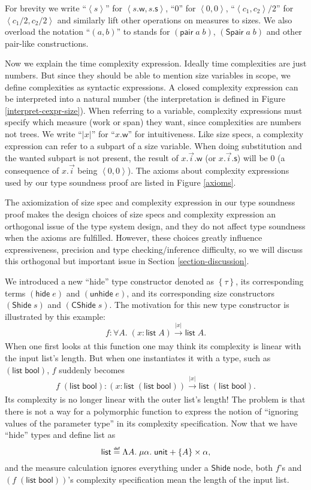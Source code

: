 \documentclass[preprint]{sigplanconf}
\newcommand{\thide}[1]{\left \{ #1 \right \}}
\newcommand{\arrow}[4]{#1\xrightarrow[#3]{#2}#4}
\newcommand{\symhide}{\mathsf{hide}}
\newcommand{\symShide}{\mathsf{Shide}}
\newcommand{\symunhide}{\mathsf{unhide}}
\newcommand{\sympair}{\mathsf{pair}}
\newcommand{\symunit}{\mathsf{unit}}
\newcommand{\symlist}{\mathsf{list}}
\newcommand{\symbool}{\mathsf{bool}}
\newcommand{\symCShide}{\mathsf{CShide}}
\newcommand{\intro}[2]{(#1 : #2)}
\newcommand{\symSpair}{\mathsf{Spair}}
\newcommand{\symwork}{\mathsf{w}}
\newcommand{\symspan}{\mathsf{s}}
\newcommand\defeq{\mathrel{\overset{\makebox[0pt]{\mbox{\normalfont\tiny\sffamily def}}}{=}}}
\newcommand{\Sstats}[1]{\left \langle #1 \right \rangle}
\begin{document}
For brevity we write ``$\Sstats{s}$'' for $\Sstats{s.\symwork,s.\symspan}$, ``0'' for $\Sstats{0,0}$, ``$\Sstats{c_1,c_2}/2$'' for $\Sstats{c_1/2,c_2/2}$ and similarly lift other operations on measures to sizes. We also overload the notation ``$(a,b)$'' to stands for $(\sympair\;a\;b)$, $(\symSpair\;a\;b)$ and other pair-like constructions.

Now we explain the time complexity expression. Ideally time complexities are just numbers. But since they should be able to mention size variables in scope, we define complexities as syntactic expressions. A closed complexity expression can be interpreted into a natural number (the interpretation is defined in Figure \ref{interpret-cexpr-size}). When referring to a variable, complexity expressions must specify which measure (work or span) they want, since complexities are numbers not trees. We write ``$|x|$'' for ``$x.\symwork$'' for intuitiveness. Like size specs, a complexity expression can refer to a subpart of a size variable. When doing substitution and the wanted subpart is not present, the result of $x.\vec{i}.\symwork$ (or $x.\vec{i}.\symspan$) will be 0 (a consequence of $x.\vec{i}$ being $\Sstats{0,0}$). The axioms about complexity expressions used by our type soundness proof are listed in Figure \ref{axioms}.

The axiomization of size spec and complexity expression in our type soundness proof makes the design choices of size specs and complexity expression an orthogonal issue of the type system design, and they do not affect type soundness when the axioms are fulfilled. However, these choices greatly influence expressiveness, precision and type checking/inference difficulty, so we will discuss this orthogonal but important issue in Section \ref{section-discussion}. 

We introduced a new ``hide'' type constructor denoted as $\thide{\tau}$, its corresponding terms $(\symhide\; e)$ and $(\symunhide\; e)$, and its corresponding size constructors $(\symShide\;s)$ and $(\symCShide\;s)$. The motivation for this new type constructor is illustrated by this example: 
$$f:\forall A.\;\arrow{\intro{x}{\symlist\;A}}{|x|}{}{\symlist\;A}.$$
When one first looks at this function one may think its complexity is linear with the input list's length. But when one instantiates it with a type, such as $(\symlist\;\symbool)$, $f$ suddenly becomes 
$$f\;(\symlist\;\symbool):\arrow{\intro{x}{\symlist\;(\symlist\;\symbool)}}{|x|}{}{\symlist\;(\symlist\;\symbool)}.$$
Its complexity is no longer linear with the outer list's length! The problem is that there is not a way for a polymorphic function to express the notion of ``ignoring values of the parameter type'' in its complexity specification. Now that we have ``hide'' types and define list as 
$$\symlist \defeq \Lambda A.\;\mu \alpha.\;\symunit + \thide{A} \times \alpha,$$ 
and the measure calculation ignores everything under a $\symShide$ node, both $f$'s and $(f\;(\symlist\;\symbool))$'s complexity specification mean the length of the input list.
\end{document}
